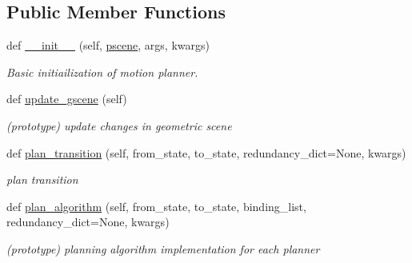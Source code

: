 \subsection*{Public Member Functions}
\begin{DoxyCompactItemize}
\item 
def \hyperlink{classrnb-planning_1_1src_1_1pkg_1_1planning_1_1motion_1_1interface_1_1_motion_interface_ab6c7209a8131ee6b4e95b07339f9ffb6}{\+\_\+\+\_\+init\+\_\+\+\_\+} (self, \hyperlink{classrnb-planning_1_1src_1_1pkg_1_1planning_1_1motion_1_1interface_1_1_motion_interface_a00c505ee267290c0439334e007b216bd}{pscene}, args, kwargs)
\begin{DoxyCompactList}\small\item\em Basic initiailization of motion planner. \end{DoxyCompactList}\item 
\mbox{\label{classrnb-planning_1_1src_1_1pkg_1_1planning_1_1motion_1_1interface_1_1_motion_interface_a97a558d0f272c919e03e9a171876359b}} 
def \hyperlink{classrnb-planning_1_1src_1_1pkg_1_1planning_1_1motion_1_1interface_1_1_motion_interface_a97a558d0f272c919e03e9a171876359b}{update\+\_\+gscene} (self)
\begin{DoxyCompactList}\small\item\em (prototype) update changes in geometric scene \end{DoxyCompactList}\item 
def \hyperlink{classrnb-planning_1_1src_1_1pkg_1_1planning_1_1motion_1_1interface_1_1_motion_interface_ac3ac8c2042f3001a7108c324a0aaec1c}{plan\+\_\+transition} (self, from\+\_\+state, to\+\_\+state, redundancy\+\_\+dict=None, kwargs)
\begin{DoxyCompactList}\small\item\em plan transition \end{DoxyCompactList}\item 
def \hyperlink{classrnb-planning_1_1src_1_1pkg_1_1planning_1_1motion_1_1interface_1_1_motion_interface_a1ebb6f845f97355c2e42001b8f23c1e7}{plan\+\_\+algorithm} (self, from\+\_\+state, to\+\_\+state, binding\+\_\+list, redundancy\+\_\+dict=None, kwargs)
\begin{DoxyCompactList}\small\item\em (prototype) planning algorithm implementation for each planner \end{DoxyCompactList}\item 

\end{DoxyCompactItemize}
